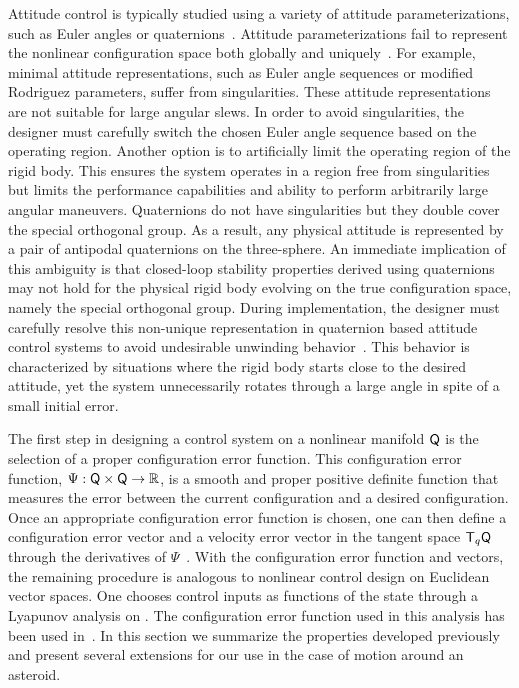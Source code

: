 Attitude control is typically studied using a variety of attitude parameterizations, such as Euler angles or quaternions~\cite{shuster1993}.
Attitude parameterizations fail to represent the nonlinear configuration space both globally and uniquely~\cite{chaturvedi2011a}.
For example, minimal attitude representations, such as Euler angle sequences or modified Rodriguez parameters, suffer from singularities.
These attitude representations are not suitable for large angular slews.
In order to avoid singularities, the designer must carefully switch the chosen Euler angle sequence based on the operating region.
Another option is to artificially limit the operating region of the rigid body.
This ensures the system operates in a region free from singularities but limits the performance capabilities and ability to perform arbitrarily large angular maneuvers.
Quaternions do not have singularities but they double cover the special orthogonal group.
As a result, any physical attitude is represented by a pair of antipodal quaternions on the three-sphere.
An immediate implication of this ambiguity is that closed-loop stability properties derived using quaternions may not hold for the physical rigid body evolving on the true configuration space, namely the special orthogonal group.
During implementation, the designer must carefully resolve this non-unique representation in quaternion based attitude control systems to avoid undesirable unwinding behavior~\cite{bhat2000}.
This behavior is characterized by situations where the rigid body starts close to the desired attitude, yet the system unnecessarily rotates through a large angle in spite of a small initial error. 

The first step in designing a control system on a nonlinear manifold \( \mathsf{Q} \) is the selection of a proper configuration error function. 
This configuration error function, \( \Psi : \mathsf{Q} \times \mathsf{Q} \to \mathbb{R} \), is a smooth and proper positive definite function that measures the error between the current configuration and a desired configuration. 
Once an appropriate configuration error function is chosen, one can then define a configuration error vector and a velocity error vector in the tangent space \( \mathsf{T}_q \mathsf{Q} \) through the derivatives of \( \Psi \)~\cite{bullo2004}. 
With the configuration error function and vectors, the remaining procedure is analogous to nonlinear control design on Euclidean vector spaces. 
One chooses control inputs as functions of the state through a Lyapunov analysis on \Q.
The configuration error function used in this analysis has been used in~\cite{bullo2004,chaturvedi2009,lee2011a,kulumani2017a}.
In this section we summarize the properties developed previously and present several extensions for our use in the case of motion around an asteroid.

